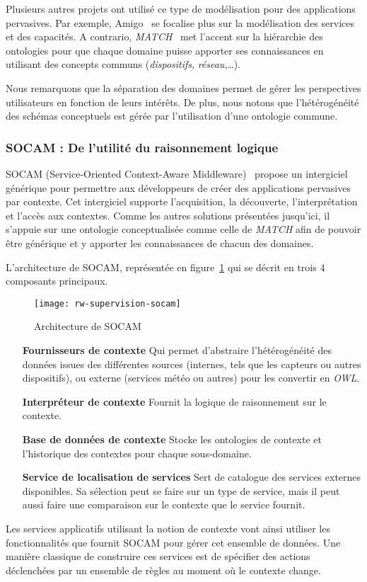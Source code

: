 Plusieurs autres projets ont utilisé ce type de modélisation pour des applications pervasives. Par exemple, Amigo~\cite{BenMokhtar:easy} se focalise plus sur la modélisation des services et des capacités. A contrario, \textit{MATCH}~\cite{Docherty:match} met l'accent sur la hiérarchie des ontologies pour que chaque domaine puisse apporter ses connaissances en utilisant des concepts communs (\textit{dispositifs}, \textit{réseau},\dots).

Nous remarquons que la séparation des domaines permet de gérer les perspectives utilisateurs en fonction de leurs intérêts. De plus, nous notons que l'hétérogénéité des schémas conceptuels est gérée par l'utilisation d'une ontologie commune.

\subsubsection{SOCAM : De l'utilité du raisonnement logique}
SOCAM (Service-Oriented Context-Aware Middleware)~\cite{Gu:socam} propose un intergiciel générique pour permettre aux développeurs de créer des applications pervasives par contexte. Cet intergiciel supporte l'acquisition, la découverte, l'interprétation et l'accès aux contextes. Comme les autres solutions présentées jusqu'ici, il s'appuie sur une ontologie conceptualisée comme celle de \textit{MATCH} afin de pouvoir être générique et y apporter les connaissances de chacun des domaines.

L'architecture de SOCAM, représentée en figure~\ref{fig:rw:supervision:socam} qui se décrit en trois 4 composants principaux.
\begin{figure}[ht]
    \centering
    \texttt{[image: rw-supervision-socam]}
    \caption{Architecture de SOCAM}\label{fig:rw:supervision:socam}
\end{figure}
\begin{itemize}
	\item[\textbf{Fournisseurs de contexte}] Qui permet d'abstraire l'hétérogénéité des données issues des différentes sources (internes, tels que les capteurs ou autres dispositifs), ou externe (services météo ou autres) pour les convertir en \textit{OWL}.
    \item[\textbf{Interpréteur de contexte}] Fournit la logique de raisonnement sur le contexte.
    \item[\textbf{Base de données de contexte}] Stocke les ontologies de contexte et l'historique des contextes pour chaque sous-domaine.
    \item[\textbf{Service de localisation de services}] Sert de catalogue des services externes disponibles. Sa sélection peut se faire sur un type de service, mais il peut aussi faire une comparaison sur le contexte que le service fournit.
\end{itemize}
Les services applicatifs utilisant la notion de contexte vont ainsi utiliser les fonctionnalités que fournit SOCAM pour gérer cet ensemble de données. Une manière classique de construire ces services est de spécifier des actions déclenchées par un ensemble de règles au moment où le contexte change.

